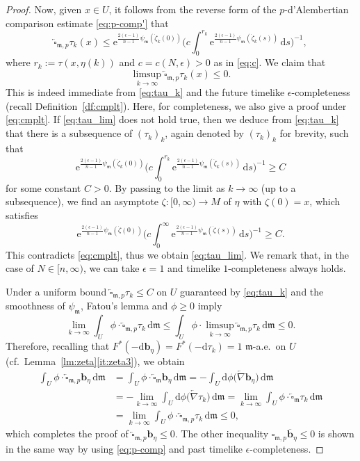 \documentclass[a4paper,11pt]{article}
\numberwithin{equation}{section}
\theoremstyle{definition}
\theoremstyle{plain}
\newcommand{\ez}{\epsilon}
\newcommand{\lra}{\longrightarrow}
\newcommand{\e}{\mathrm{e}}
\newcommand{\dd}{\mathrm{d}}
\newcommand{\fm}{\ensuremath{\mathfrak{m}}}
\newcommand{\bb}{\ensuremath{\mathbf{b}}}
\newcommand{\rev}[1]{\overleftarrow{#1}}
\newcommand{\ol}[1]{\overline{#1}}
\begin{document}
\begin{proof}
Now, given $x \in U$, it follows from the reverse form of the $p$-d'Alembertian comparison estimate \eqref{eq:p-comp'} that
\begin{equation}\label{eq:tau_k}
\rev{\square}_{\fm,p} \tau_k (x)
 \le \e^{\frac{2(\ez-1)}{n-1}\psi_\fm (\dot{\zeta}_k(0))}
 \biggl( c\int_0^{r_k} \e^{\frac{2(\ez-1)}{n-1}\psi_\fm (\dot{\zeta}_k(s))} \,\dd s \biggr)^{-1},
\end{equation}
where $r_k:=\tau(x,\eta(k))$ and $c=c(N,\ez)>0$ as in \eqref{eq:c}.
We claim that
\begin{equation}\label{eq:tau_lim}
\limsup_{k \to \infty} \rev{\square}_{\fm,p} \tau_k (x) \le 0.
\end{equation}
This is indeed immediate from \eqref{eq:tau_k} and the future timelike $\ez$-completeness (recall Definition~\ref{df:cmplt}).
Here, for completeness, we also give a proof under \eqref{eq:cmplt}.
If \eqref{eq:tau_lim} does not hold true,
then we deduce from \eqref{eq:tau_k} that there is a subsequence of $(\tau_k)_k$,
again denoted by $(\tau_k)_k$ for brevity, such that
\[ \e^{\frac{2(\ez-1)}{n-1}\psi_\fm (\dot{\zeta}_k(0))}
 \biggl( c\int_0^{r_k} \e^{\frac{2(\ez-1)}{n-1}\psi_\fm (\dot{\zeta}_k(s))} \,\dd s \biggr)^{-1} \ge C \]
for some constant $C>0$.
By passing to the limit as $k \to \infty$ (up to a subsequence), we find an asymptote $\zeta\colon [0,\infty) \lra M$ of $\eta$ with $\zeta(0)=x$, which satisfies
\[ \e^{\frac{2(\ez-1)}{n-1}\psi_\fm (\dot{\zeta}(0))}
 \biggl( c\int_0^{\infty} \e^{\frac{2(\ez-1)}{n-1}\psi_\fm (\dot{\zeta}(s))} \,\dd s \biggr)^{-1} \ge C. \]
This contradicts \eqref{eq:cmplt}, thus we obtain \eqref{eq:tau_lim}.
We remark that, in the case of $N \in [n,\infty)$, we can take $\ez=1$ and timelike $1$-completeness always holds.

Under a uniform bound $\rev{\square}_{\fm,p} \tau_k \le C$ on $U$ guaranteed by \eqref{eq:tau_k} and the smoothness of $\psi_\fm$, Fatou's lemma and $\phi \ge 0$ imply
\[ \lim_{k \to \infty} \int_U \phi \cdot \rev{\square}_{\fm,p} \tau_k \,\dd\fm
 \le \int_U \phi \cdot \limsup_{k \to \infty} \rev{\square}_{\fm,p} \tau_k \,\dd\fm \le 0. \]
Therefore, recalling that $F^* (-\dd \bb_{\eta}) =F^*(-\dd\tau_k) =1$ $\fm$-a.e.\ on $U$ (cf.\ Lemma~\ref{lm:zeta}\eqref{it:zeta3}), we obtain
\begin{align*}
\int_U \phi \cdot \rev{\square}_{\fm,p} \bb_\eta \,\dd\fm
&= \int_U \phi \cdot \rev{\square}_\fm \bb_\eta \,\dd\fm
=-\int_U \dd\phi \bigl( \rev{\nabla} \bb_\eta \bigr) \,\dd\fm \\
&=-\lim_{k \to \infty} \int_U \dd\phi \bigl( \rev{\nabla} \tau_k \bigr) \,\dd\fm
=\lim_{k \to \infty} \int_U \phi \cdot \rev{\square}_{\fm} \tau_k \,\dd\fm \\
&= \lim_{k \to \infty} \int_U \phi \cdot \rev{\square}_{\fm,p} \tau_k \,\dd\fm \le 0,
\end{align*}
which completes the proof of $\rev{\square}_{\fm,p} \bb_\eta \le 0$.
The other inequality $\square_{\fm,p} \ol{\bb}_\eta \le 0$ is shown in the same way by using \eqref{eq:p-comp} and past timelike $\ez$-completeness.
\end{proof}
\end{document}
